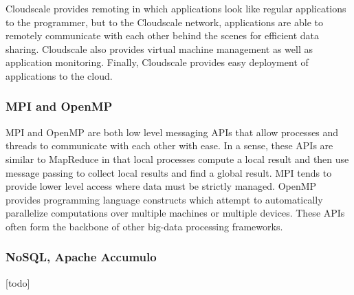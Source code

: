 Cloudscale provides remoting in which applications look like regular applications to the programmer, but to the Cloudscale network, applications are able to remotely communicate with each other behind the scenes for efficient data sharing. Cloudscale also provides virtual machine management as well as application monitoring.
Finally, Cloudscale provides easy deployment of applications to the cloud.

\subsubsection{MPI and OpenMP}
MPI and OpenMP are both low level messaging APIs that allow processes and threads to communicate with each other with ease. In a sense, these APIs are similar to MapReduce in that local processes compute a local result and then use message passing to collect local results and find a global result. MPI tends to provide lower level access where data must be strictly managed. OpenMP provides programming language constructs which attempt to automatically parallelize computations over multiple machines or multiple devices. These APIs often form the backbone of other big-data processing frameworks.

\subsubsection{NoSQL, Apache Accumulo}
[todo]
